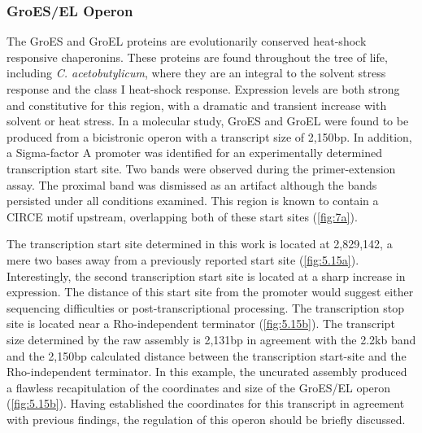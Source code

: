 \subsubsection{GroES/EL Operon}
The GroES and GroEL proteins are evolutionarily conserved heat-shock responsive chaperonins. These proteins are found throughout the tree of life, including \textit{C. acetobutylicum}, where they are an integral to the solvent stress response\cite{74,75,76} and the class I heat-shock response\cite{42,74,75}. Expression levels are both strong and constitutive for this region, with a dramatic and transient increase with solvent or heat stress\cite{74,75}. In a molecular study, GroES and GroEL were found to be produced from a bicistronic operon with a transcript size of 2,150bp\cite{76}. In addition, a Sigma-factor A promoter was identified for an experimentally determined transcription start site. Two bands were observed during the primer-extension assay\cite{76}. The proximal band was dismissed as an artifact although the bands persisted under all conditions examined\cite{76}. This region is known to contain a CIRCE motif upstream\cite{77}, overlapping both of these start sites (\ref{fig:7a})\cite{75}. 

The transcription start site determined in this work is located at 2,829,142, a mere two bases away from a previously reported start site\cite{76} (\ref{fig:5.15a}). Interestingly, the second transcription start site is located at a sharp increase in expression. The distance of this start site from the promoter would suggest either sequencing difficulties or post-transcriptional processing. The transcription stop site is located near a Rho-independent terminator (\ref{fig:5.15b}). The transcript size determined by the raw assembly is 2,131bp in agreement with the 2.2kb band and the 2,150bp calculated distance between the transcription start-site and the Rho-independent terminator\cite{77}. In this example, the uncurated assembly produced a flawless recapitulation of the coordinates and size of the GroES/EL operon (\ref{fig:5.15b}). Having established the coordinates for this transcript in agreement with previous findings, the regulation of this operon should be briefly discussed.

